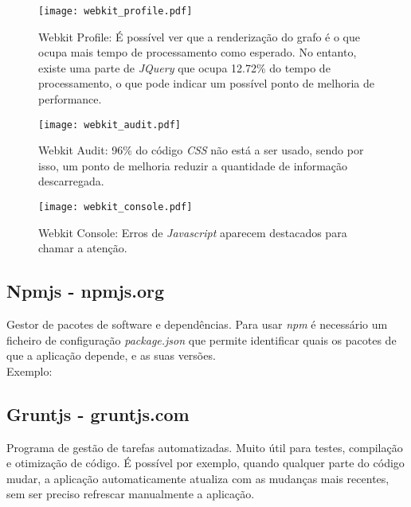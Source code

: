     \begin{figure}
      \begin{center}
        \texttt{[image: webkit\_profile.pdf]}
      \end{center}
      \caption{Webkit Profile: É possível ver que a renderização do grafo é o que ocupa mais tempo de processamento como esperado. No entanto, existe uma parte de \emph{JQuery} que ocupa 12.72\% do tempo de processamento, o que pode indicar um possível ponto de melhoria de performance.}
      \label{fig:webkit_profile}
    \end{figure}

    \begin{figure}
      \begin{center}
        \texttt{[image: webkit\_audit.pdf]}
      \end{center}
      \caption{Webkit Audit: 96\% do código \emph{CSS} não está a ser usado, sendo por isso, um ponto de melhoria reduzir a quantidade de informação descarregada.}
      \label{fig:webkit_audit}
    \end{figure}

    \begin{figure}
      \begin{center}
        \texttt{[image: webkit\_console.pdf]}
      \end{center}
      \caption{Webkit Console: Erros de \emph{Javascript} aparecem destacados para chamar a atenção.}
      \label{fig:webkit_console}
    \end{figure}


  \subsection{Npmjs - npmjs.org} %
  \label{sub:npm}
    Gestor de pacotes de software e dependências.
    Para usar \emph{npm} é necessário um ficheiro de configuração \emph{package.json} que permite identificar quais os pacotes de que a aplicação depende, e as suas versões. \\
    Exemplo:

    


  \subsection{Gruntjs - gruntjs.com} %
    \label{sub:gruntjs} 
      Programa de gestão de tarefas automatizadas.
      Muito útil para testes, compilação e otimização de código.
      É possível por exemplo, quando qualquer parte do código mudar, a aplicação automaticamente atualiza com as mudanças mais recentes, sem ser preciso refrescar manualmente a aplicação.

